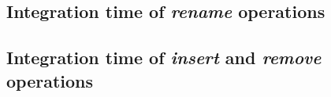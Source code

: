 \documentclass{article}
\theoremstyle{definition}
\begin{document}
\subsection{Integration time of \emph{rename} operations}


\subsection{Integration time of \emph{insert} and \emph{remove} operations}




\end{document}
